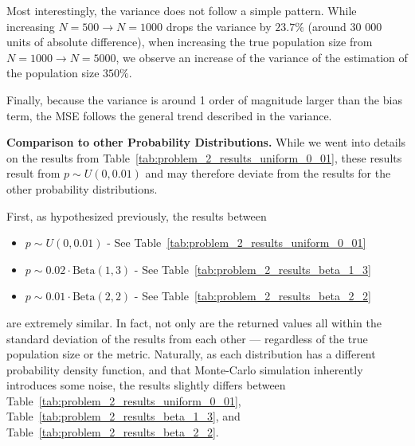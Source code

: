 Most interestingly, the variance does not follow a simple pattern. While increasing $N=500 \to N=1000$ drops the variance by $23.7\%$ (around 30 000 units of absolute difference), when increasing the true population size from $N=1000 \to N=5000$, we observe an increase of the variance of the estimation of the population size $350\%$.

Finally, because the variance is around 1 order of magnitude larger than the bias term, the MSE follows the general trend described in the variance.

\textbf{Comparison to other Probability Distributions.}
While we went into details on the results from Table~\ref{tab:problem_2_results_uniform_0_01}, these results result from $p\sim U(0, 0.01)$ and may therefore deviate from the results for the other probability distributions.

First, as hypothesized previously, the results between 
\begin{itemize}
    \item $p \sim U(0, 0.01)$ - See Table~\ref{tab:problem_2_results_uniform_0_01}
    \item $p \sim 0.02 \cdot \mathrm{Beta}(1, 3)$ - See Table~\ref{tab:problem_2_results_beta_1_3}
    \item $p \sim 0.01 \cdot \mathrm{Beta}(2, 2)$ - See Table~\ref{tab:problem_2_results_beta_2_2}
\end{itemize}
are extremely similar.
In fact, not only are the returned values all within the standard deviation of the results from each other --- regardless of the true population size or the metric.
Naturally, as each distribution has a different probability density function, and that Monte-Carlo simulation inherently introduces some noise, the results slightly differs between Table~\ref{tab:problem_2_results_uniform_0_01}, Table~\ref{tab:problem_2_results_beta_1_3}, and Table~\ref{tab:problem_2_results_beta_2_2}.

